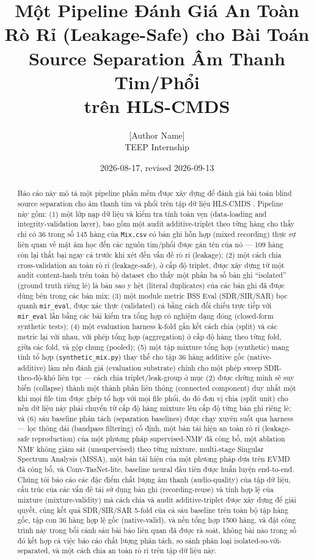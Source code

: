 \documentclass[11pt]{article}
\title{Một Pipeline Đánh Giá An Toàn Rò Rỉ (Leakage-Safe) cho Bài Toán Source Separation Âm Thanh Tim/Phổi\\
trên HLS-CMDS}
\author{[Author Name] \\ TEEP Internship}
\date{2026-08-17, revised 2026-09-13}
\begin{document}
\maketitle

\begin{abstract}
Báo cáo này mô tả một pipeline phần mềm được xây dựng để đánh giá bài toán
blind source separation cho âm thanh tim và phổi trên tập dữ liệu HLS-CMDS
\cite{hlscmds}. Pipeline này gồm: (1) một lớp nạp dữ liệu và kiểm tra tính
toàn vẹn (data-loading and integrity-validation layer), bao gồm một audit
additive-triplet theo từng hàng cho thấy chỉ có 36 trong số 145 hàng của
\texttt{Mix.csv} có bản ghi hỗn hợp (mixed recording) thực sự liên quan về
mặt âm học đến các nguồn tim/phổi được gán tên của nó --- 109 hàng còn lại
thất bại ngay cả trước khi xét đến vấn đề rò rỉ (leakage); (2) một cách chia
cross-validation an toàn rò rỉ (leakage-safe), ở cấp độ triplet, được xây
dựng từ một audit content-hash trên toàn bộ dataset cho thấy một phần ba số
bản ghi ``isolated'' (ground truth riêng lẻ) là bản sao y hệt (literal
duplicates) của các bản ghi đã được dùng bên trong các bản mix; (3) một
module metric BSS Eval (SDR/SIR/SAR) bọc quanh \texttt{mir\_eval}, được xác
thực (validated) cả bằng cách đối chiếu trực tiếp với \texttt{mir\_eval} lẫn
bằng các bài kiểm tra tổng hợp có nghiệm dạng đóng (closed-form synthetic
tests); (4) một evaluation harness k-fold gắn kết cách chia (split) và các
metric lại với nhau, với phép tổng hợp (aggregation) ở cấp độ hàng theo
từng fold, giữa các fold, và gộp chung (pooled); (5) một tập mixture tổng
hợp (synthetic) mang tính tổ hợp (\texttt{synthetic\_mix.py}) thay thế cho
tập 36 hàng additive gốc (native-additive) làm nền đánh giá (evaluation
substrate) chính cho một phép sweep SDR-theo-độ-khó liên tục --- cách chia
triplet/leak-group ở mục (2) được chứng minh sẽ suy biến (collapse) thành
một thành phần liên thông (connected component) duy nhất một khi mọi file
tim được ghép tổ hợp với mọi file phổi, do đó đơn vị chia (split unit) cho
nền dữ liệu này phải chuyển từ cấp độ hàng mixture lên cấp độ từng bản ghi
riêng lẻ; và (6) sáu baseline phân tách (separation baselines) được chạy
xuyên suốt qua harness --- lọc thông dải (bandpass filtering) cố định, một
bản tái hiện an toàn rò rỉ (leakage-safe reproduction) của một phương pháp
supervised-NMF đã công bố, một ablation NMF không giám sát (unsupervised)
theo từng mixture, multi-stage Singular Spectrum Analysis (MSSA), một bản
tái hiện của một phương pháp dựa trên EVMD đã công bố, và Conv-TasNet-lite,
baseline neural đầu tiên được huấn luyện end-to-end. Chúng tôi báo cáo các
đặc điểm chất lượng âm thanh (audio-quality) của tập dữ liệu, cấu trúc của
các vấn đề tái sử dụng bản ghi (recording-reuse) và tính hợp lệ của mixture
(mixture-validity) mà cách chia và audit additive-triplet được xây dựng để
giải quyết, cùng kết quả SDR/SIR/SAR 5-fold của cả sáu baseline trên toàn
bộ tập hàng gốc, tập con 36 hàng hợp lệ gốc (native-valid), và nền tổng hợp
1500 hàng, và đặt công trình này trong bối cảnh sáu bài báo liên quan đã
được rà soát, không bài nào trong số đó kết hợp cả việc báo cáo chất lượng
phân tách, so sánh phân loại isolated-so-với-separated, và một cách chia
an toàn rò rỉ trên tập dữ liệu này.


\end{abstract}
\end{document}
